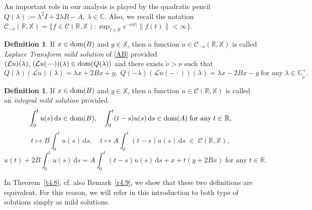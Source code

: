 \documentclass[11pt]{amsart}
\numberwithin{equation}{section}
\newcommand{\RR}{{\mathbb R}}
\newcommand{\CC}{{\mathbb C}}
\newcommand{\rmd}{{\mathrm{d}}}
\theoremstyle{remark}
\theoremstyle{definition}
\newtheorem{definition}[theorem]{Definition}
\newcommand\bX{{\mathbb X}}
\newcommand{\tnu}{{\widetilde{\nu}}}
\newcommand{\dom}{\text{\rm{dom}}}
\begin{document}
An important role in our analysis is played by the quadratic pencil $Q(\lambda):=\lambda^2 I+2\lambda B-A$, $\lambda\in\CC$. Also, we recall the notation
$\mathcal{C}_{-\nu}(\mathbb{R},\bX)
	= \big\{ f \in \mathcal{C}(\mathbb{R},\bX) : \sup_{t \in \mathbb{R}} e^{-\nu|t|}\|f(t)\| < \infty \big\}$. 
\begin{definition}\label{Def-mild}
	If $x\in\dom(B)$ and $y\in\bX$, then a function $u \in \mathcal{C}_{-\nu}(\mathbb{R},\bX)$ is called \emph{Laplace Transform mild solution} of \eqref{AB}
	provided $(\mathcal{L}u)(\lambda),\, (\mathcal{L}u(-\cdot))(\lambda) \in \dom(Q(\lambda))$ and there exists $\tnu>\nu$ such that
	\begin{equation}\label{Def-Lap-Mild}
		Q(\lambda)(\mathcal{L}u)(\lambda) = \lambda x + 2Bx + y,\; Q(-\lambda)(\mathcal{L}u(-\cdot))(\lambda) = \lambda x - 2Bx - y\;\mbox{for any}\;\lambda \in \mathbb{C}^+_{\tnu}. 
	\end{equation}
\end{definition}
\begin{definition}\label{Def-Int-Mild}
	If $x\in\dom(B)$ and $y\in\bX$, then a function $u \in \mathcal{C}(\mathbb{R}, \bX)$ is called an \emph{integral mild solution} provided	
	\begin{equation}\label{domain-cond}
		\int_0^t u(s)\,\rmd s \in \dom(B),\quad
		\int_0^t (t-s)u(s)\,\rmd s \in \dom(A)\;\mbox{for any}\; t\in\RR,
	\end{equation}
	\begin{equation}\label{cont-cond}
		t \mapsto B\int_0^t u(s)\,\rmd s, \quad
		t \mapsto A\int_0^t (t-s)u(s)\,\rmd s \;\in\; \mathcal{C}(\mathbb{R}, \bX),
	\end{equation}
	\begin{equation}\label{Int-Mild}
		u(t) + 2B\int_0^t u(s)\,\rmd s
		= A\int_0^t (t-s)u(s)\,\rmd s + x + t(y + 2Bx)\;\mbox{for any}\; t\in\RR.
	\end{equation}
\end{definition}
In Theorem~\ref{t4.8}, cf. also Remark~\ref{r4.9}, we show that these two definitions are equivalent. For this reason, we will refer in this introduction to both type of solutions simply as mild solutions.
\end{document}
